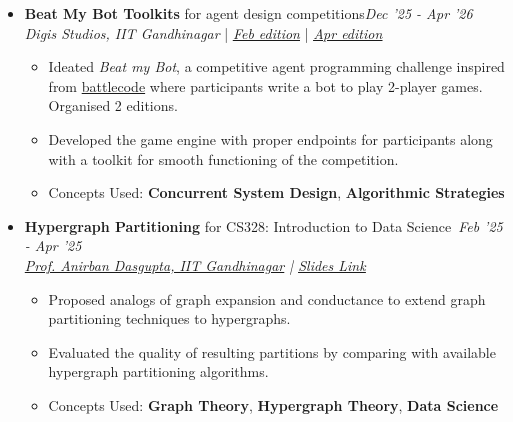 \documentclass[a4paper,10pt]{article}
\newcommand{\isep}{-2 pt}
\begin{document}
\begin{itemize}
    \item \textbf{Beat My Bot Toolkits} for agent design competitions\hfill \emph{Dec '25 - Apr '26}\\\emph{Digis Studios, IIT Gandhinagar} |  \href{https://github.com/Digis-Studios/BeatMyBot-v1} {\emph{\underline{Feb edition}}} | \href{https://github.com/Digis-Studios/BeatMyBot-v2} {\emph{\underline{Apr edition}}} \\[-0.6cm]
    \begin{itemize}\itemsep \isep
        \item Ideated \textit{Beat my Bot}, a competitive agent programming challenge inspired from \href{https://battlecode.org/}{battlecode} where participants write a bot to play 2-player games. Organised 2 editions. 
        \item Developed the game engine with proper endpoints for participants along with a toolkit for smooth functioning of the competition.
        \item Concepts Used: \textbf{Concurrent System Design}, \textbf{Algorithmic Strategies}
    \end{itemize}

    
    \item \textbf{Hypergraph Partitioning} for CS328: Introduction to Data Science\ \hfill \emph{Feb '25 - Apr '25} \\
    \emph{\href{https://iitgn.ac.in/faculty/cse/anirban}{Prof. Anirban Dasgupta, IIT Gandhinagar} | \href{https://iitgnacin-my.sharepoint.com/:p:/g/personal/23110347_iitgn_ac_in/EaKxciw9JGtCqNscOs_NtvAB2attA6mQTuEfX_IayUCxWA?e=DpNzSA}{\underline{Slides Link}}}\\[-0.6cm]
    \begin{itemize}\itemsep \isep
        \item Proposed analogs of graph expansion and conductance to extend graph partitioning techniques to hypergraphs. 
        \item Evaluated the quality of resulting partitions by comparing with available hypergraph partitioning algorithms.
        \item Concepts Used: \textbf{Graph Theory}, \textbf{Hypergraph Theory}, \textbf{Data Science}

    \end{itemize}


\end{itemize}
\end{document}

